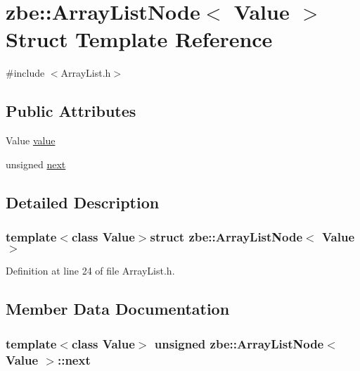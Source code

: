 \hypertarget{structzbe_1_1_array_list_node}{}\section{zbe\+:\+:Array\+List\+Node$<$ Value $>$ Struct Template Reference}
\label{structzbe_1_1_array_list_node}


{\ttfamily \#include $<$Array\+List.\+h$>$}

\subsection*{Public Attributes}
\begin{DoxyCompactItemize}
\item 
Value \hyperlink{structzbe_1_1_array_list_node_a4b6ed91c41d1a05f5cbc5a159f27b97d}{value}
\item 
unsigned \hyperlink{structzbe_1_1_array_list_node_a3972b617e2a407a2a601a027b516980e}{next}
\end{DoxyCompactItemize}


\subsection{Detailed Description}
\subsubsection*{template$<$class Value$>$struct zbe\+::\+Array\+List\+Node$<$ Value $>$}



Definition at line 24 of file Array\+List.\+h.



\subsection{Member Data Documentation}
\hypertarget{structzbe_1_1_array_list_node_a3972b617e2a407a2a601a027b516980e}{}
\subsubsection[{next}]{\setlength{\rightskip}{0pt plus 5cm}template$<$class Value$>$ unsigned {\bf zbe\+::\+Array\+List\+Node}$<$ Value $>$\+::next}\label{structzbe_1_1_array_list_node_a3972b617e2a407a2a601a027b516980e}



